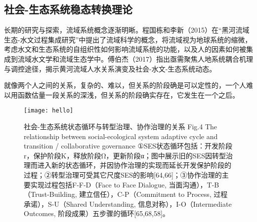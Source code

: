 \subsection{社会-生态系统稳态转换理论}

长期的研究与探索，流域系统概念逐渐明晰。程国栋和李新（2015）在“黑河流域生态-水文过程集成研究”中提出了流域科学的概念，将流域视为地球系统的缩微，考虑水文和生态系统的自组织性如何影响流域系统的功能，以及人的因素如何被集成到流域水文学和流域生态学中。傅伯杰（2017）指出亟需聚焦人地系统耦合机理与调控途径，揭示黄河流域人水关系演变及社会-水文-生态系统动态。

就像两个人之间的关系，复杂的、难以，但关系的阶段确是可以定性的，一个人难以用函数估量一段关系的深浅，但关系的阶段确实存在，它发生在一个之后。


\begin{figure}[htb] %
    \centering
    \texttt{[image: hello]}
    \caption[社会-生态系统状态循环]{社会-生态系统状态循环与转型治理、协作治理的关系
    Fig.4  The relationship between social-ecological system adaptive cycle and transition / collaborative governance
    ①SES状态循环包括：开发阶段r，保护阶段K，释放阶段Ω，更新阶段α；图中展示旧的SES因转型治理而进入新的状态循环，并因协作治理的实现而延长开发保护阶段的过程；②转型治理可受其它尺度SES的影响[64,66]；③协作治理的主要实现过程包括F-F-D（Face to Face Dialogue, 当面沟通），T-B（Trust-Building, 建立信任），C-P（Commitment to Process, 过程承诺），S-U（Shared Understanding, 信息对称），I-O（Intermediate Outcomes, 阶段成果）五步骤的循环[65,68,58]。}
    \label{fig:xfig0}
\end{figure}

